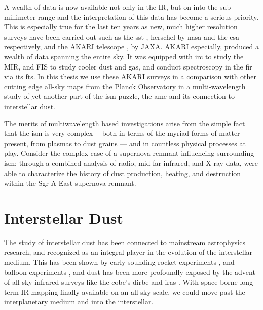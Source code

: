     A wealth of data is now available not only in the IR, but on into the sub-millimeter range and the interpretation of this data has become a serious priority. This is especially true for the last ten years as new, much higher resolution surveys have been carried out such as the \gls{sst} \cite{spitzer04}, \gls{herschel} \citep{herschel10} by \gls{nasa} and the \gls{esa} respectively, and the AKARI telescope \citep{akari07},  by JAXA. AKARI especially, produced a wealth of data spanning the entire sky. It was equipped with \gls{irc} \citep{irc07} to study the MIR, and FIS \citep{fis07} to study cooler dust and gas, and conduct spectroscopy in the \gls{fir} via its \gls{fts}. In this thesis we use these AKARI surveys in a comparison with other cutting edge all-sky maps from the Planck Observatory in a multi-wavelength study of yet another part of the \gls{ism} puzzle, the \gls{ame} and its connection to interstellar dust.

    The merits of multiwavelength based investigations arise from the simple fact that the \gls{ism} is very complex--- both in terms of the myriad forms of matter present, from plasmas to dust grains --- and in countless physical processes at play. Consider the complex case of a supernova remnant influencing surrounding \gls{ism}: through a combined analysis of radio, mid-far infrared, and X-ray data, \cite{lau15} were able to characterize the history of dust production, heating, and destruction within the Sgr A East supernova remnant.


\section{Interstellar Dust}

    The study of interstellar dust has been connected to mainstream astrophysics research, and recognized as an integral player in the evolution of the interstellar medium. This has been shown by early sounding rocket experiments \citep{wolstencroft67,soifer71}, and balloon experiments \citep{muehlner70,emerson73}, and dust has been more profoundly exposed by the advent of all-sky infrared surveys like the \gls{cobe}'s \gls{dirbe} \citep{sodroski94} and \gls{iras} \citep{iras84}.
    With space-borne long-term IR mapping finally available on an all-sky scale, we could move past the interplanetary medium and into the interstellar.

